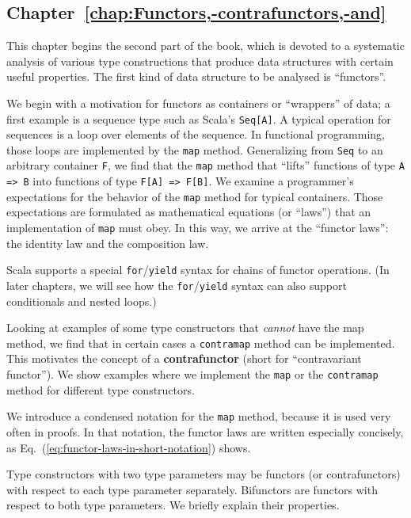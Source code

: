 \subsection{Chapter~\ref{chap:Functors,-contrafunctors,-and}}

This chapter begins the second part of the book, which is devoted
to a systematic analysis of various type constructions that produce
data structures with certain useful properties. The first kind of
data structure to be analysed is \textsf{``}functors\textsf{''}.

We begin with a motivation for functors as containers or \textsf{``}wrappers\textsf{''}
of data; a first example is a sequence type such as Scala\textsf{'}s \lstinline!Seq[A]!.
A typical operation for sequences is a loop over elements of the sequence.
In functional programming, those loops are implemented by the \lstinline!map!
method. Generalizing from \lstinline!Seq! to an arbitrary container
\lstinline!F!, we find that the \lstinline!map! method that \textsf{``}lifts\textsf{''}
functions of type \lstinline!A => B! into functions of type \lstinline!F[A] => F[B]!.
We examine a programmer\textsf{'}s expectations for the behavior of the \lstinline!map!
method for typical containers. Those expectations are formulated as
mathematical equations (or \textsf{``}laws\textsf{''}) that an implementation of \lstinline!map!
must obey. In this way, we arrive at the \textsf{``}functor laws\textsf{''}: the identity
law and the composition law.

Scala supports a special \lstinline!for!/\lstinline!yield! syntax
for chains of functor operations. (In later chapters, we will see
how the \lstinline!for!/\lstinline!yield! syntax can also support
conditionals and nested loops.)

Looking at examples of some type constructors that \emph{cannot} have
the map method, we find that in certain cases a \lstinline!contramap!
method can be implemented. This motivates the concept of a \textbf{contrafunctor}
(short for \textsf{``}contravariant functor\textsf{''}). We show examples where we
implement the \lstinline!map! or the \lstinline!contramap! method
for different type constructors.

We introduce a condensed notation for the \lstinline!map! method,
because it is used very often in proofs. In that notation, the functor
laws are written especially concisely, as Eq.~(\ref{eq:functor-laws-in-short-notation})
shows.

Type constructors with two type parameters may be functors (or contrafunctors)
with respect to each type parameter separately. Bifunctors are functors
with respect to both type parameters. We briefly explain their properties.

